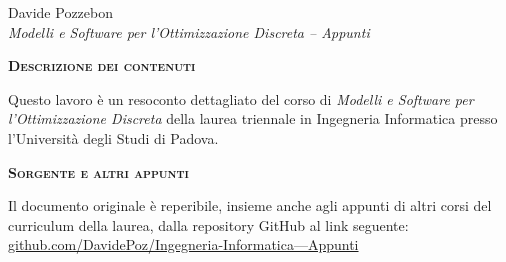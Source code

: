 \thispagestyle{empty} %

\vspace*{5cm}
\begin{center}
    {\large Davide Pozzebon}\\[0.5cm]
    {\itshape Modelli e Software per l'Ottimizzazione Discreta -- Appunti}\\[0.5cm]
\end{center}

\vspace*{\fill}

\noindent \textbf{\textsc{Descrizione dei contenuti}}

\vspace{0.5em}
\noindent \small
Questo lavoro è un resoconto dettagliato del corso di 
\textit{Modelli e Software per l'Ottimizzazione Discreta} della laurea 
triennale in Ingegneria Informatica presso l'Università degli Studi di Padova.

\vspace{1.5em}
\noindent \textbf{\textsc{Sorgente e altri appunti}}

\vspace{0.5em}
\noindent \small
Il documento originale è reperibile, insieme anche agli appunti di altri corsi del
curriculum della laurea, dalla repository GitHub al link seguente:
\href{https://github.com/DavidePoz/Ingegneria-Informatica---Appunti.git}
     {github.com/DavidePoz/Ingegneria-Informatica---Appunti}

\vspace*{1cm}
